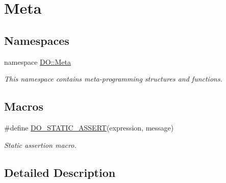 \hypertarget{group___meta}{\section{Meta}
\label{group___meta}
}
\subsection*{Namespaces}
\begin{DoxyCompactItemize}
\item 
namespace \hyperlink{namespace_d_o_1_1_meta}{D\-O\-::\-Meta}
\begin{DoxyCompactList}\small\item\em This namespace contains meta-\/programming structures and functions. \end{DoxyCompactList}\end{DoxyCompactItemize}
\subsection*{Macros}
\begin{DoxyCompactItemize}
\item 
\#define \hyperlink{group___meta_ga2b69d33b4b707fde292f656c4e27b6a9}{D\-O\-\_\-\-S\-T\-A\-T\-I\-C\-\_\-\-A\-S\-S\-E\-R\-T}(expression, message)
\begin{DoxyCompactList}\small\item\em Static assertion macro. \end{DoxyCompactList}\end{DoxyCompactItemize}


\subsection{Detailed Description}


